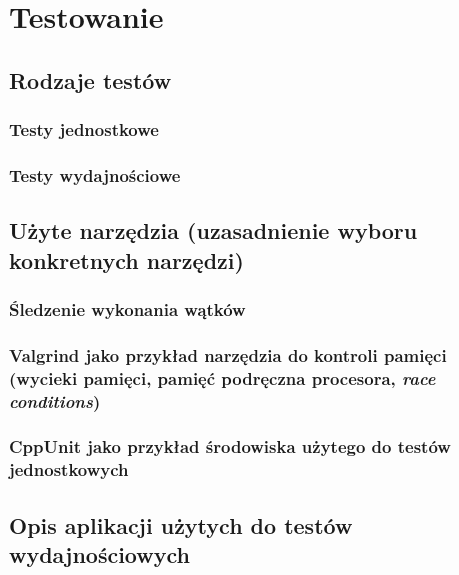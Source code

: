 \section{Testowanie}

\subsection{Rodzaje testów}

\subsubsection{Testy jednostkowe}

\subsubsection{Testy wydajnościowe}

\subsection{Użyte narzędzia (uzasadnienie wyboru konkretnych narzędzi)}

\subsubsection{Śledzenie wykonania wątków}

\subsubsection{Valgrind jako przykład narzędzia do kontroli pamięci
							 (wycieki pamięci, pamięć podręczna procesora, 
							 \emph{race conditions})}

\subsubsection{CppUnit jako przykład środowiska użytego do testów jednostkowych}

\subsection{Opis aplikacji użytych do testów wydajnościowych}

